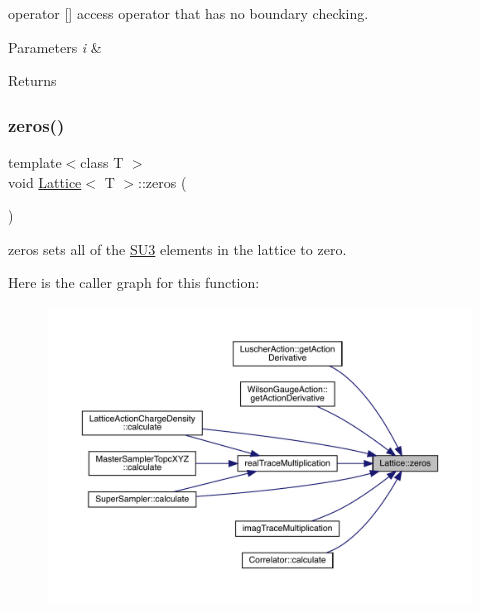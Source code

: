operator \mbox{[}\mbox{]} access operator that has no boundary checking. 


\begin{DoxyParams}{Parameters}
{\em i} & \\
\hline
\end{DoxyParams}
\begin{DoxyReturn}{Returns}

\end{DoxyReturn}
\mbox{\label{class_lattice_a1e8bfb54f85e78f2c97e8b90d2b47dc9}} 
\subsubsection{\texorpdfstring{zeros()}{zeros()}}
{\footnotesize\ttfamily template$<$class T $>$ \\
void \mbox{\hyperlink{class_lattice}{Lattice}}$<$ T $>$\+::zeros (\begin{DoxyParamCaption}{ }\end{DoxyParamCaption})\hspace{0.3cm}{\ttfamily [inline]}}



zeros sets all of the \mbox{\hyperlink{class_s_u3}{S\+U3}} elements in the lattice to zero. 

Here is the caller graph for this function\+:
\nopagebreak
\begin{figure}[H]
\begin{center}
\leavevmode
\includegraphics[width=350pt]{class_lattice_a1e8bfb54f85e78f2c97e8b90d2b47dc9_icgraph}
\end{center}
\end{figure}



